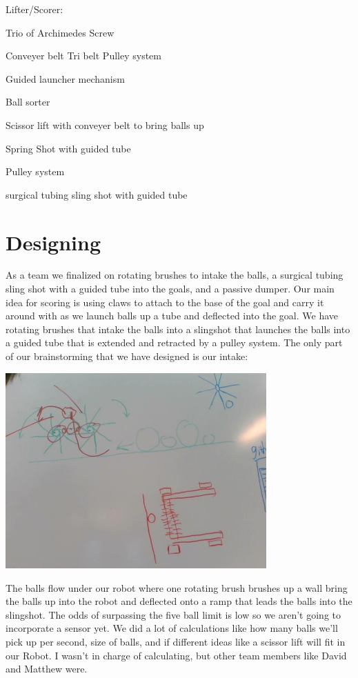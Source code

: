 \begin{itemize}
Lifter/Scorer:

Trio of Archimedes Screw

Conveyer belt Tri belt Pulley system

Guided launcher mechanism

Ball sorter

Scissor lift with conveyer belt to bring balls up

Spring Shot with guided tube

Pulley system

surgical tubing sling shot with guided tube

\section*{Designing}
As a team we finalized on rotating brushes to intake the balls,
a surgical tubing sling shot with a guided tube into the goals,
and a passive dumper. Our main idea for scoring is using claws to attach
to the base of the goal and carry it around with as we launch balls up a tube and
deflected into the goal. We have rotating brushes that intake the balls into a
slingshot that launches the balls into a guided tube that is extended and retracted by
a pulley system. The only part of our brainstorming that we have designed is our intake:

\begin{center}
 \includegraphics[width=10cm]{./Entries/Images/RotatingBrushes.jpg}
 \end{center}

The balls flow under our robot where one rotating brush brushes up a wall bring the
balls up into the robot and deflected onto a ramp that leads the balls into the
slingshot. The odds of surpassing the five ball limit is low so we aren’t going to incorporate a sensor yet. 
We did a lot of calculations like how many balls we’ll pick up per second, size of balls, and if different ideas like a scissor lift will fit in our Robot. I wasn’t in charge of calculating, but other team members like David and Matthew were.


\end{itemize}
